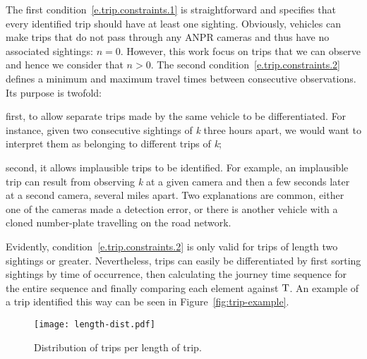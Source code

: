 The first condition~\ref{e.trip.constraints.1} is straightforward and specifies that every identified trip should have at least one sighting. Obviously, vehicles can make trips that do not pass through any ANPR cameras and thus have no associated sightings: $n = 0$. However, this work focus on trips that we can observe and hence we consider that $n > 0$. The second condition~\ref{e.trip.constraints.2} defines a minimum and maximum travel times between consecutive observations. Its purpose is twofold:
\begin{enumerate*}[label=(\roman*)]
  \item first, to allow separate trips made by the same vehicle to be differentiated. For instance, given two consecutive sightings of \emph{k} three hours apart, we would want to interpret them as belonging to different trips of \emph{k};
  \item second, it allows implausible trips to be identified. For example, an implausible trip can result from observing \emph{k} at a given camera and then a few seconds later at a second camera, several miles apart. Two explanations are common, either one of the cameras made a detection error, or there is another vehicle with a cloned number-plate travelling on the road network.
\end{enumerate*} Evidently, condition~\ref{e.trip.constraints.2} is only valid for trips of length two sightings or greater. Nevertheless, trips can easily be differentiated by first sorting sightings by time of occurrence, then calculating the journey time sequence for the entire sequence and finally comparing each element against $\mathrm{T}$. An example of a trip identified this way can be seen in Figure~\ref{fig:trip-example}.

\begin{figure}[t]
  \centering
  \texttt{[image: length-dist.pdf]}
  \caption{Distribution of trips per length of trip.}
  \label{fig:length-dist}
\end{figure}

